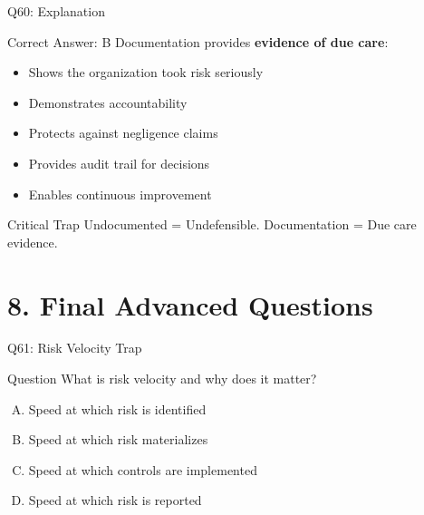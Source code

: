 \documentclass{beamer}
\begin{document}
	\begin{frame}{Q60: Explanation}
		\begin{block}{Correct Answer: B}
			Documentation provides \textbf{evidence of due care}:
			\begin{itemize}
				\item Shows the organization took risk seriously
				\item Demonstrates accountability
				\item Protects against negligence claims
				\item Provides audit trail for decisions
				\item Enables continuous improvement
			\end{itemize}
		\end{block}
		\begin{alertblock}{Critical Trap}
			Undocumented = Undefensible.
			Documentation = Due care evidence.
		\end{alertblock}
	\end{frame}
	
	
	\section{8. Final Advanced Questions}
	
	\begin{frame}{Q61: Risk Velocity Trap}
		\begin{block}{Question}
			What is risk velocity and why does it matter?
		\end{block}
		\begin{enumerate}[(A)]
			\item Speed at which risk is identified
			\item Speed at which risk materializes
			\item Speed at which controls are implemented
			\item Speed at which risk is reported
		\end{enumerate}
	\end{frame}
	
\end{document}
